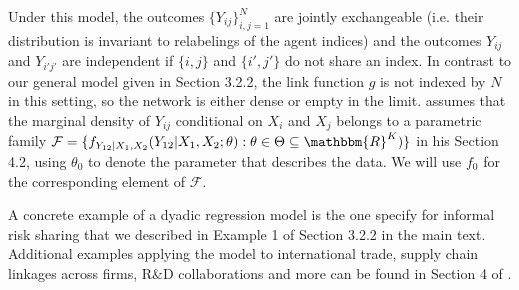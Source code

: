 \documentclass[12pt]{article}
\theoremstyle{definition}
\begin{document}
Under this model, the outcomes $\{Y_{ij}\}_{i,j = 1}^{N}$ are jointly exchangeable (i.e. their distribution is invariant to relabelings of the agent indices) and the outcomes $Y_{ij}$ and $Y_{i'j'}$ are independent if $\{i,j\}$ and $\{i',j'\}$ do not share an index. In contrast to our general model given in Section 3.2.2, the link function $g$ is not indexed by $N$ in this setting, so the network is either dense or empty in the limit. \cite{graham2020network} assumes that the marginal density of $Y_{ij}$ conditional on $X_i$ and $X_j$ belongs to a parametric family $\mathcal{F} =\{f_{Y_{12}|X_1,X_2}(Y_{12}|X_1,X_2;\theta): \theta \in \Theta \subseteq \mathbbm{R}^{K})\}$ in his Section 4.2, using $\theta_0$ to denote the parameter that describes the data. We will use $f_0$ for the corresponding element of $\mathcal{F}$.    

A concrete example of a dyadic regression model is the one \cite{fafchamps2007risk} specify for informal risk sharing that we described in Example 1 of Section 3.2.2 in the main text. Additional examples applying the model to international trade, supply chain linkages across firms, R\&D collaborations and more can be found in Section 4 of  \cite{graham2020network}.  
\end{document}
